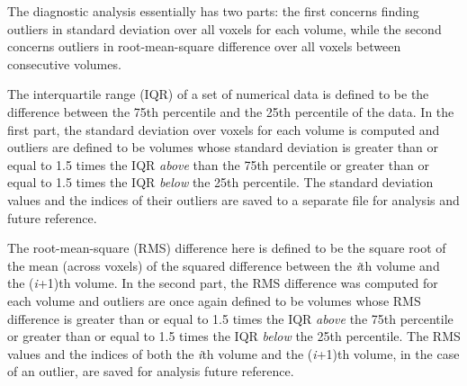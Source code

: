 
\par The diagnostic analysis essentially has two parts: the first concerns
finding outliers in standard deviation over all voxels for each volume, while
the second concerns outliers in root-mean-square difference over all voxels
between consecutive volumes.

\par \indent The interquartile range (IQR) of a set of numerical data is defined
to be the difference between the 75th percentile and the 25th percentile of the
data. In the first part, the standard deviation over voxels for each volume is
computed and outliers are defined to be volumes whose standard deviation is
greater than or equal to 1.5 times the IQR \textit{above} than the 75th
percentile or greater than or equal to 1.5 times the IQR \textit{below} the 25th
percentile. The standard deviation values and the indices of their outliers are
saved to a separate file for analysis and future reference.

\par \indent The root-mean-square (RMS) difference here is defined to be the
square root of the mean (across voxels) of the squared difference between the
\textit{i}th volume and the (\textit{i}+1)th volume. In the second part, the RMS
difference was computed for each volume and outliers are once again defined to
be volumes whose RMS difference is greater than or equal to 1.5 times the IQR
\textit{above} the 75th percentile or greater than or equal to 1.5 times the IQR
\textit{below} the 25th percentile. The RMS values and the indices of both the
\textit{i}th volume and the (\textit{i}+1)th volume, in the case of an outlier,
are saved for analysis future reference.
